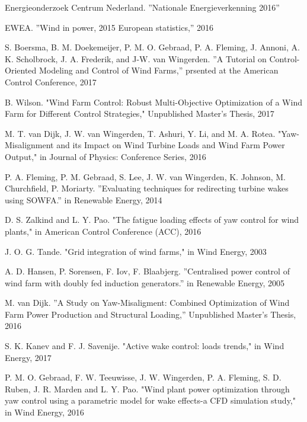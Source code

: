 \begin{thebibliography}{99} %

Energieonderzoek Centrum Nederland. ''Nationale Energieverkenning 2016''

EWEA. ''Wind in power, 2015 European statistics,'' 2016

S. Boersma, B. M. Doekemeijer, P. M. O. Gebraad, P. A. Fleming, J. Annoni,
A. K. Scholbrock, J. A. Frederik, and J-W. van Wingerden. ''A Tutorial on Control-Oriented Modeling and Control of Wind Farms,''
prsented at the American Control Conference, 2017

B. Wilson. "Wind Farm Control: Robust Multi-Objective Optimization of a Wind Farm for Different Control Strategies," Unpublished Master's Thesis, 2017

M. T. van Dijk, J. W. van Wingerden, T. Ashuri, Y. Li, and M. A. Rotea. "Yaw-Misalignment and its Impact on Wind Turbine Loads and Wind Farm Power Output," in Journal of Physics: Conference Series, 2016

P. A. Fleming, P. M. Gebraad, S. Lee, J. W. van Wingerden, K. Johnson, M. Churchfield, P. Moriarty. ''Evaluating techniques for redirecting turbine wakes using SOWFA.'' in Renewable Energy, 2014

D. S. Zalkind and L. Y. Pao. "The fatigue loading effects of yaw control for wind plants," in American Control Conference (ACC), 2016

J. O. G. Tande. "Grid integration of wind farms," in Wind Energy, 2003

A. D. Hansen, P. Sorensen, F. Iov, F. Blaabjerg. ''Centralised power control of wind farm with doubly fed induction generators.'' in Renewable Energy, 2005

M. van Dijk. ''A Study on Yaw-Misaligment: Combined Optimization of Wind Farm Power Production and Structural Loading,'' Unpublished Master's Thesis, 2016

S. K. Kanev and F. J. Savenije. "Active wake control: loads trends," in Wind Energy, 2017

P. M. O. Gebraad, F. W. Teeuwisse, J. W. Wingerden, P. A. Fleming, S. D. Ruben, J. R. Marden and L. Y. Pao. "Wind plant power optimization through yaw control using a parametric model for wake effects-a CFD simulation study," in Wind Energy, 2016


\end{thebibliography}
